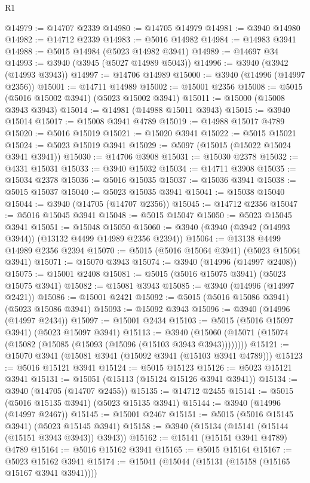 \begin{lexlean}{R1}
\begin{coremodule}
@14979 := @14707 @2339
@14980 := @14705 @14979
@14981 := @3940 @14980
@14982 := @14712 @2339
@14983 := @5016 @14982
@14984 := @14983 @3941
@14988 := @5015 @14984 (@5023 @14982 @3941)
@14989 := @14697 @34
@14993 := @3940 (@3945 (@5027 @14989 @5043))
@14996 := @3940 (@3942 (@14993 @3943))
@14997 := @14706 @14989
@15000 := @3940 (@14996 (@14997 @2356))
@15001 := @14711 @14989
@15002 := @15001 @2356
@15008 := @5015 (@5016 @15002 @3941) (@5023 @15002 @3941)
@15011 := @15000 (@15008 @3943 @3943)
@15014 := @14981 (@14988 @15011 @3943)
@15015 := @3940 @15014
@15017 := @15008 @3941 @4789
@15019 := @14988 @15017 @4789
@15020 := @5016 @15019
@15021 := @15020 @3941
@15022 := @5015 @15021
@15024 := @5023 @15019 @3941
@15029 := @5097 (@15015 (@15022 @15024 @3941 @3941))
@15030 := @14706 @3908
@15031 := @15030 @2378
@15032 := @4331 @15031
@15033 := @3940 @15032
@15034 := @14711 @3908
@15035 := @15034 @2378
@15036 := @5016 @15035
@15037 := @15036 @3941
@15038 := @5015 @15037
@15040 := @5023 @15035 @3941
@15041 := @15038 @15040
@15044 := @3940 (@14705 (@14707 @2356))
@15045 := @14712 @2356
@15047 := @5016 @15045 @3941
@15048 := @5015 @15047
@15050 := @5023 @15045 @3941
@15051 := @15048 @15050
@15060 := @3940 (@3940 (@3942 (@14993 @3944)) (@13132 @4499 @14989 @2356 @2394))
@15064 := @13138 @4499 @14989 @2356 @2394
@15070 := @5015 (@5016 @15064 @3941) (@5023 @15064 @3941)
@15071 := @15070 @3943
@15074 := @3940 (@14996 (@14997 @2408))
@15075 := @15001 @2408
@15081 := @5015 (@5016 @15075 @3941) (@5023 @15075 @3941)
@15082 := @15081 @3943
@15085 := @3940 (@14996 (@14997 @2421))
@15086 := @15001 @2421
@15092 := @5015 (@5016 @15086 @3941) (@5023 @15086 @3941)
@15093 := @15092 @3943
@15096 := @3940 (@14996 (@14997 @2434))
@15097 := @15001 @2434
@15103 := @5015 (@5016 @15097 @3941) (@5023 @15097 @3941)
@15113 := @3940 (@15060 (@15071 (@15074 (@15082 (@15085 (@15093 (@15096 (@15103 @3943 @3943))))))))
@15121 := @15070 @3941 (@15081 @3941 (@15092 @3941 (@15103 @3941 @4789)))
@15123 := @5016 @15121 @3941
@15124 := @5015 @15123
@15126 := @5023 @15121 @3941
@15131 := @15051 (@15113 (@15124 @15126 @3941 @3941))
@15134 := @3940 (@14705 (@14707 @2455))
@15135 := @14712 @2455
@15141 := @5015 (@5016 @15135 @3941) (@5023 @15135 @3941)
@15144 := @3940 (@14996 (@14997 @2467))
@15145 := @15001 @2467
@15151 := @5015 (@5016 @15145 @3941) (@5023 @15145 @3941)
@15158 := @3940 (@15134 (@15141 (@15144 (@15151 @3943 @3943)) @3943))
@15162 := @15141 (@15151 @3941 @4789) @4789
@15164 := @5016 @15162 @3941
@15165 := @5015 @15164
@15167 := @5023 @15162 @3941
@15174 := @15041 (@15044 (@15131 (@15158 (@15165 @15167 @3941 @3941))))

\end{coremodule}
\end{lexlean}
